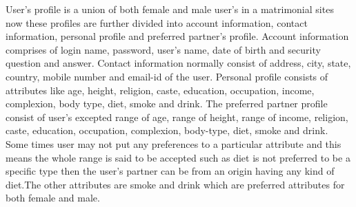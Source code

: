 \documentclass[12pt,oneside]{book}
\begin{document}
User's profile is a union of both female and male user's in a matrimonial sites now these profiles are further divided into account information, contact information, personal profile and preferred partner's profile. Account information comprises of login name, password, user's name, date of birth and security question and answer. Contact information normally consist of address, city, state, country, mobile number and email-id of the user. Personal profile consists of  attributes like age, height, religion, caste, education, occupation, income, complexion, body type, diet, smoke and drink. The preferred partner profile consist of user's excepted range of age, range of height, range of income, religion, caste, education, occupation, complexion, body-type, diet, smoke and drink. Some times user may not put any preferences to a particular attribute and this means the whole range is said to be accepted such as diet is not preferred to be a specific type then the user's partner can be from an origin having any kind of diet.The other attributes are smoke and drink which are preferred attributes for both female and male. 
\end{document}
